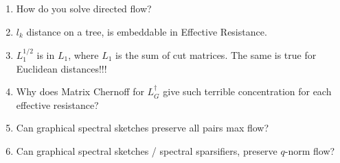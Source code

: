 \documentclass[12pt]{article}
\begin{document}
\begin{enumerate}
\item How do you solve directed flow?
\item $l_k$ distance on a tree, is embeddable in Effective Resistance.
\item $L_1^{1/2}$ is in $L_1$, where $L_1$ is the sum of cut
matrices. The same is true for Euclidean distances!!!
\item Why does Matrix Chernoff for $L_G^\dag$ give such terrible
concentration for each effective resistance?
\item Can graphical spectral sketches preserve all pairs max flow?
\item Can graphical spectral sketches / spectral sparsifiers, preserve
$q$-norm flow?
\end{enumerate}
\end{document}
